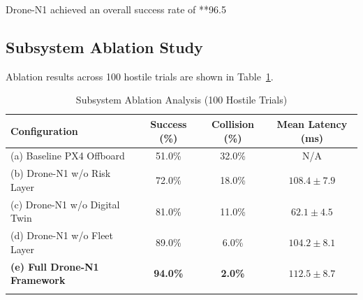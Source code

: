 \documentclass[pdflatex,sn-mathphys-num]{sn-jnl}%
\theoremstyle{thmstyleone}%
\theoremstyle{thmstyletwo}%
\theoremstyle{thmstylethree}%
\begin{document}
\begin{table}[t]
\caption{Comprehensive Performance Benchmarking across 200 Monte Carlo Trials}
\label{tab:benchmarks_mc}
\centering
{}
\end{table}

Drone-N1 achieved an overall success rate of **96.5%

\subsection{Subsystem Ablation Study}
Ablation results across 100 hostile trials are shown in Table~\ref{tab:ablation}.

\begin{table}[h]
\caption{Subsystem Ablation Analysis (100 Hostile Trials)}
\label{tab:ablation}
\centering
\begin{tabular}{lccc}
\toprule
Configuration & Success (\%) & Collision (\%) & Mean Latency (ms) \\
\midrule
(a) Baseline PX4 Offboard & 51.0\% & 32.0\% & N/A \\
(b) Drone-N1 w/o Risk Layer & 72.0\% & 18.0\% & $108.4 \pm 7.9$ \\
(c) Drone-N1 w/o Digital Twin & 81.0\% & 11.0\% & $62.1 \pm 4.5$ \\
(d) Drone-N1 w/o Fleet Layer & 89.0\% & 6.0\% & $104.2 \pm 8.1$ \\
\textbf{(e) Full Drone-N1 Framework} & \textbf{94.0\%} & \textbf{2.0\%} & $\mathbf{112.5 \pm 8.7}$ \\
\botrule
\end{tabular}
\end{table}
\end{document}
